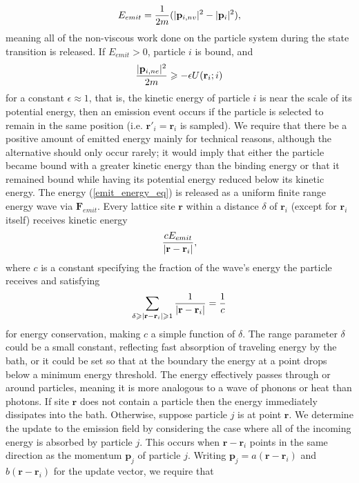 \documentclass[12pt,letterpaper]{article}
\newcommand{\mb}{\mathbf}
\begin{document}
\begin{itemize}
\begin{align}
\label{emit_energy_eq}
E_{emit} = {1 \over 2m}(|\mb{p}_{i,nv}|^{2} - |\mb{p}_{i}|^{2}),
\end{align}
meaning all of the non-viscous work done on the particle system during the state transition is released. If $E_{emit} > 0$, particle $i$ is bound, and
\begin{align*}
{|\mb{p}_{i,ne}|^{2} \over 2m} \geqslant -\epsilon U(\mb{r}_{i}; i)
\end{align*}
for a constant $\epsilon \approx 1$, that is, the kinetic energy of particle $i$ is near the scale of its potential energy, then an emission event occurs if the particle is selected to remain in the same position (i.e. $\mb{r}'_{i} = \mb{r}_{i}$ is sampled). We require that there be a positive amount of emitted energy mainly for technical reasons, although the alternative should only occur rarely; it would imply that either the particle became bound with a greater kinetic energy than the binding energy or that it remained bound while having its potential energy reduced below its kinetic energy. The energy (\ref{emit_energy_eq}) is released as a uniform finite range energy wave via $\mb{F}_{emit}$. Every lattice site $\mb{r}$ within a distance $\delta$ of $\mb{r}_{i}$ (except for $\mb{r}_{i}$ itself) receives kinetic energy
\begin{align*}
{cE_{emit} \over |\mb{r} - \mb{r}_{i}|},
\end{align*}
where $c$ is a constant specifying the fraction of the wave's energy the particle receives and satisfying
\begin{align*}
\sum_{\delta \geqslant |\mb{r} - \mb{r}_{i}| \geqslant 1}{1 \over |\mb{r} - \mb{r}_{i}|} = {1 \over c}
\end{align*}
for energy conservation, making $c$ a simple function of $\delta$. The range parameter $\delta$ could be a small constant, reflecting fast absorption of traveling energy by the bath, or it could be set so that at the boundary the energy at a point drops below a minimum energy threshold. The energy effectively passes through or around particles, meaning it is more analogous to a wave of phonons or heat than photons. If site $\mb{r}$ does not contain a particle then the energy immediately dissipates into the bath. Otherwise, suppose particle $j$ is at point $\mb{r}$. We determine the update to the emission field by considering the case where all of the incoming energy is absorbed by particle $j$. This occurs when $\mb{r} - \mb{r}_{i}$ points in the same direction as the momentum $\mb{p}_{j}$ of particle $j$. Writing $\mb{p}_{j} = a(\mb{r} - \mb{r}_{i})$ and $b(\mb{r} - \mb{r}_{i})$ for the update vector, we require that

\end{itemize}
\end{document}
